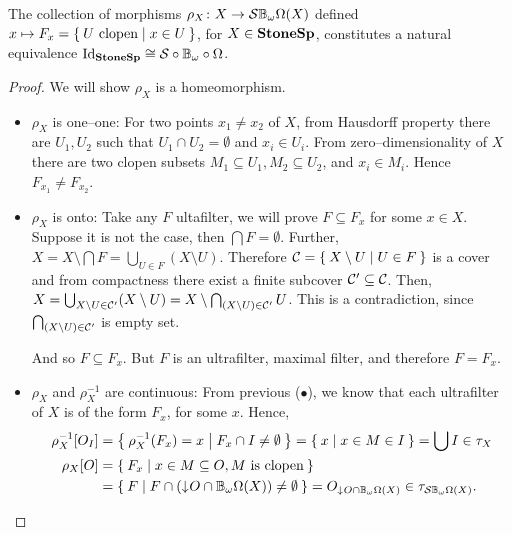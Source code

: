 \begin{proposition}
    The collection of morphisms $\rho_X\colon X \to \mathcal{S}\mathbb{B}_{\omega}\Omega(X)$ defined $x \mapsto F_x = \Set{U\text{ clopen} | x\in U }$, for $X \in \mathbf{StoneSp}$, constitutes a natural equivalence $\operatorname{Id}_{\mathbf{StoneSp}} \cong \mathcal{S}\circ\mathbb{B}_{\omega}\circ\Omega$.
\end{proposition}
\begin{proof}
    We will show $\rho_X$ is a homeomorphism.
    \begin{itemize}
        \item $\rho_X$ is one--one: For two points $x_1 \neq x_2$ of $X$, from Hausdorff property there are $U_1, U_2$ such that $U_1\cap U_2 = \emptyset$ and $x_i\in U_i$. From zero--dimensionality of $X$ there are two clopen subsets $M_1 \subseteq U_1, M_2 \subseteq U_2$, and $x_i \in M_i$. Hence $F_{x_1} \neq F_{x_2}$.

        \item $\rho_X$ is onto: Take any $F$ ultafilter, we will prove $F \subseteq F_x$ for some $x\in X$. Suppose it is not the case, then $\bigcap F = \emptyset$. Further, $X = X \setminus \bigcap F = \bigcup_{U\in F} (X\setminus U)$. Therefore $\mathcal{ C } = \Set{X \setminus U | U\in F}$ is a cover and from compactness there exist a finite subcover $\mathcal{ C }'\subseteq \mathcal{ C }$. Then, $X = \bigcup_{X \setminus U\in \mathcal{ C }'} (X\setminus U) = X \setminus \bigcap_{(X \setminus U)\in \mathcal{ C }'} U$. This is a contradiction, since $\bigcap_{(X \setminus U)\in \mathcal{ C }'}$ is empty set.

        And so $F \subseteq F_x$. But $F$ is an ultrafilter, maximal filter, and therefore $F = F_x$.

        \item $\rho_X$ and $\rho_X^{-1}$ are continuous: From previous ($\bullet$), we know that each ultrafilter of $X$ is of the form $F_x$, for some $x$. Hence,
        \begin{align*}
            \rho_X^{-1}[O_I] &= \Set{ \rho_X^{-1}(F_x) = x | F_x \cap I \neq \emptyset}
                = \Set{ x | x \in M \in I } = \bigcup I \in \tau_X \\
            \rho_X[O] &= \Set{ F_x | x \in M \subseteq O, M \text{ is clopen}} \\
                      &= \Set{ F | F \cap (\mathord{\downarrow}\mkern1muO \cap \ensuremath{\mathbb{B}_{\omega}}\Omega(X)) \neq \emptyset} = O_{\mathord{\downarrow}\mkern1mu O \cap \mathbb{B}_{\omega}\Omega(X)} \in \tau_{\mathcal{S}\mathbb{B}_{\omega}\Omega(X)}.
        \end{align*}
    \end{itemize}


\end{proof}
